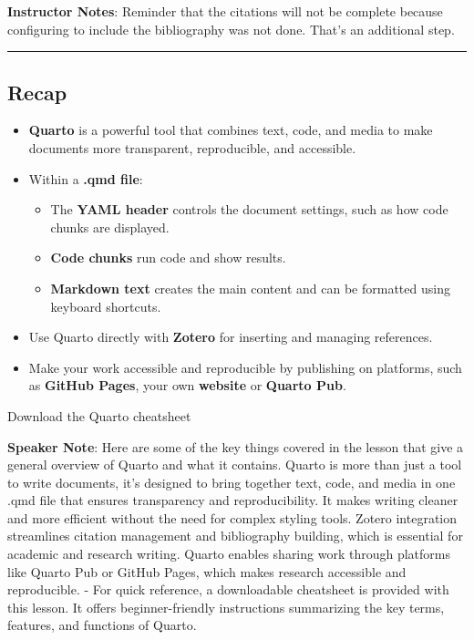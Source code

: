 \documentclass[
  letterpaper,
  DIV=11,
  numbers=noendperiod]{scrartcl}
\providecommand{\tightlist}{%
  \setlength{\itemsep}{0pt}\setlength{\parskip}{0pt}}
\begin{document}
\textbf{Instructor Notes}: Reminder that the citations will not be
complete because configuring to include the bibliography was not done.
That's an additional step.

\begin{center}\rule{0.5\linewidth}{0.5pt}\end{center}

\subsection{Recap}\label{recap}

\begin{itemize}
\tightlist
\item
  \textbf{Quarto} is a powerful tool that combines text, code, and media
  to make documents more transparent, reproducible, and accessible.
\item
  Within a \textbf{.qmd file}:

  \begin{itemize}
  \tightlist
  \item
    The \textbf{YAML header} controls the document settings, such as how
    code chunks are displayed.
  \item
    \textbf{Code chunks} run code and show results.
  \item
    \textbf{Markdown text} creates the main content and can be formatted
    using keyboard shortcuts.
  \end{itemize}
\item
  Use Quarto directly with \textbf{Zotero} for inserting and managing
  references.
\item
  Make your work accessible and reproducible by publishing on platforms,
  such as \textbf{GitHub Pages}, your own \textbf{website} or
  \textbf{Quarto Pub}.
\end{itemize}

Download the Quarto cheatsheet

\textbf{Speaker Note}: Here are some of the key things covered in the
lesson that give a general overview of Quarto and what it contains.
Quarto is more than just a tool to write documents, it's designed to
bring together text, code, and media in one .qmd file that ensures
transparency and reproducibility. It makes writing cleaner and more
efficient without the need for complex styling tools. Zotero integration
streamlines citation management and bibliography building, which is
essential for academic and research writing. Quarto enables sharing work
through platforms like Quarto Pub or GitHub Pages, which makes research
accessible and reproducible. - For quick reference, a downloadable
cheatsheet is provided with this lesson. It offers beginner-friendly
instructions summarizing the key terms, features, and functions of
Quarto.
\end{document}
